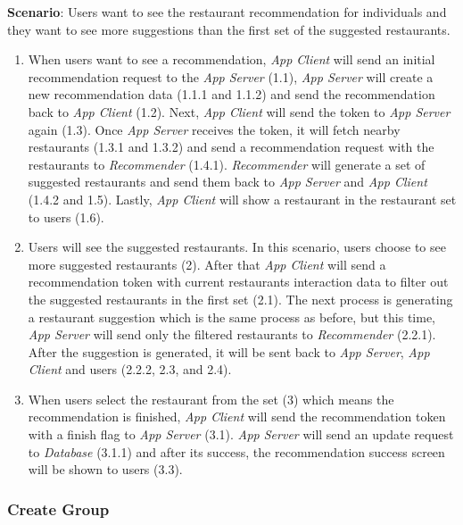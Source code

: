 \documentclass[12pt,oneside,openright,a4paper]{cpe-english-project}
\begin{document}
\newpage
\textbf{Scenario}: Users want to see the restaurant recommendation for individuals and they want to see more suggestions than the first set of the suggested restaurants.
\begin{enumerate}
\item When users want to see a recommendation, \textit{App Client} will send an initial recommendation request to the \textit{App Server} (1.1), \textit{App Server} will create a new recommendation data (1.1.1 and 1.1.2) and send the recommendation back to \textit{App Client} (1.2). Next, \textit{App Client} will send the token to \textit{App Server} again (1.3). Once \textit{App Server} receives the token, it will fetch nearby restaurants (1.3.1 and 1.3.2) and send a recommendation request with the restaurants to \textit{Recommender} (1.4.1). \textit{Recommender} will generate a set of suggested restaurants and send them back to \textit{App Server} and \textit{App Client} (1.4.2 and 1.5). Lastly, \textit{App Client} will show a restaurant in the restaurant set to users  (1.6).
\item Users will see the suggested restaurants. In this scenario, users choose to see more suggested restaurants (2). After that \textit{App Client} will send a recommendation token with current restaurants interaction data to filter out the suggested restaurants in the first set (2.1). The next process is generating a restaurant suggestion which is the same process as before, but this time, \textit{App Server} will send only the filtered restaurants to \textit{Recommender} (2.2.1). After the suggestion is generated, it will be sent back to \textit{App Server}, \textit{App Client} and users (2.2.2, 2.3, and 2.4).
\item When users select the restaurant from the set (3) which means the recommendation is finished, \textit{App Client} will send the recommendation token with a finish flag to \textit{App Server} (3.1). \textit{App Server} will send an update request to \textit{Database} (3.1.1) and after its success, the recommendation success screen will be shown to users (3.3).
\end{enumerate}



\newpage

\subsubsection{Create Group}
\end{document}
